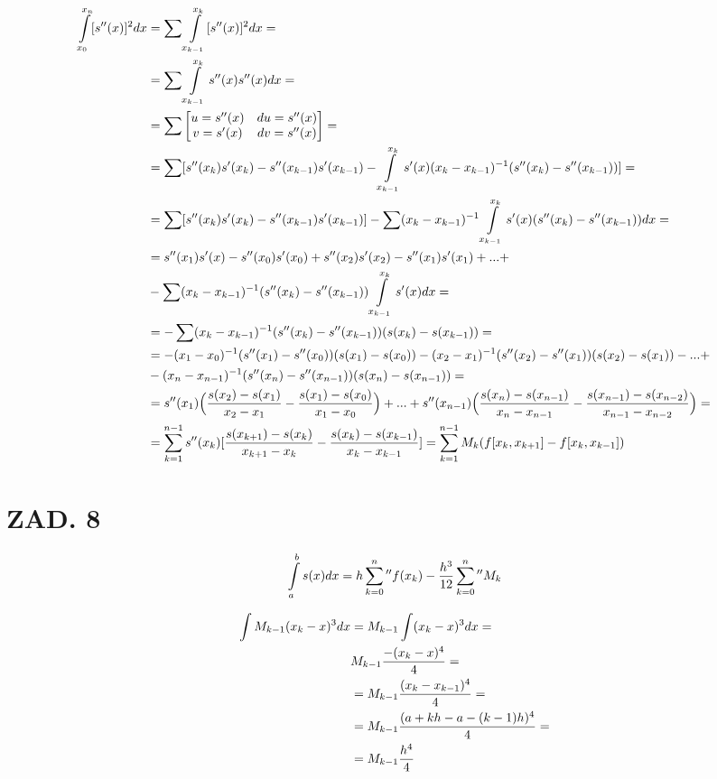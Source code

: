 \documentclass{article}[16pt]
\begin{document}
\begin{align*}
    \int\limits_{x_0}^{x_n}[s''(x)]^2dx&=\sum\int\limits_{x_{k-1}}^{x_k}[s''(x)]^2dx=\\
    &=\sum\int\limits_{x_{k-1}}^{x_k}s''(x)s''(x)dx=\\
    &=\sum\begin{bmatrix}u=s''(x)& du=s''(x)\\v=s'(x)&dv=s''(x)\end{bmatrix}=\\
    &=\sum[s''(x_k)s'(x_k)-s''(x_{k-1})s'(x_{k-1})-\int\limits_{x_{k-1}}^{x_k}s'(x)(x_k-x_{k-1})^{-1}(s''(x_k)-s''(x_{k-1}))]=\\
    &=\sum[s''(x_k)s'(x_k)-s''(x_{k-1})s'(x_{k-1})]-\sum(x_k-x_{k-1})^{-1}\int\limits_{x_{k-1}}^{x_k}s'(x)(s''(x_k)-s''(x_{k-1}))dx=\\
    &=s''(x_1)s'(x)-s''(x_0)s'(x_0)+s''(x_2)s'(x_2)-s''(x_1)s'(x_1)+...+\\
    &-\sum(x_k-x_{k-1})^{-1}(s''(x_k)-s''(x_{k-1}))\int\limits_{x_{k-1}}^{x_k}s'(x)dx=\\
    &=-\sum (x_k-x_{k-1})^{-1}(s''(x_k)-s''(x_{k-1}))(s(x_k)-s(x_{k-1}))=\\
    &=-(x_1-x_0)^{-1}(s''(x_1)-s''(x_0))(s(x_1)-s(x_0))-(x_2-x_1)^{-1}(s''(x_2)-s''(x_1))(s(x_2)-s(x_1))-...+\\
    &-(x_n-x_{n-1})^{-1}(s''(x_n)-s''(x_{n-1}))(s(x_n)-s(x_{n-1}))=\\
    &=s''(x_1)\Big({s(x_2)-s(x_1)\over x_2-x_1}-{s(x_1)-s(x_0)\over x_1-x_0}\Big)+...+s''(x_{n-1})\Big({s(x_{n})-s(x_{n-1})\over x_{n}-x_{n-1}}-{s(x_{n-1})-s(x_{n-2})\over x_{n-1}-x_{n-2}}\Big)=\\
    &=\sum\limits_{k=1}^{n-1}s''(x_k)[{s(x_{k+1})-s(x_k)\over x_{k+1}-x_k}-{s(x_k)-s(x_{k-1})\over x_k-x_{k-1}}]=\sum\limits_{k=1}^{n-1}M_k(f[x_k, x_{k+1}]-f[x_k, x_{k-1}])
\end{align*}


\section*{ZAD. 8}

$$\int\limits_a^bs(x)dx=h\sum\limits_{k=0}^{n}{''}f(x_k)-{h^3\over12}\sum\limits_{k=0}^{n}{''}M_k$$

\begin{align*}
    \int M_{k-1}(x_k-x)^3dx&=M_{k-1}\int(x_k-x)^3dx=\\
    &M_{k-1}{-(x_k-x)^4\over4}=\\
    &=M_{k-1}{(x_k-x_{k-1})^4\over 4}=\\
    &=M_{k-1}{(a+kh-a-(k-1)h)^4\over4}=\\
    &=M_{k-1}{h^4\over4}
\end{align*}
\end{document}
